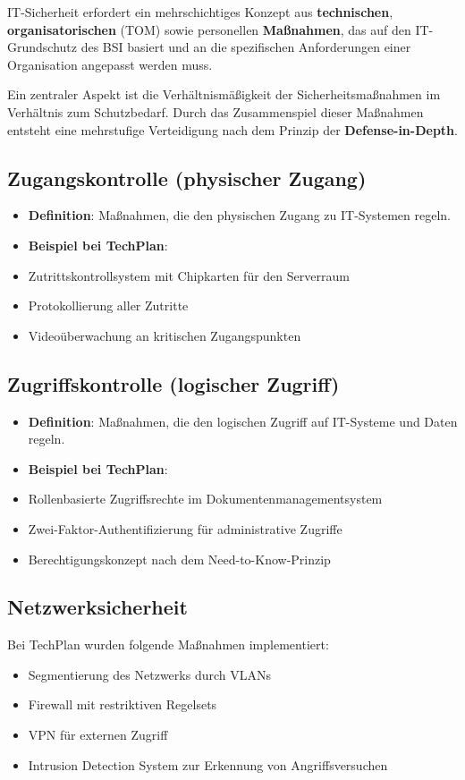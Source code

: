 \documentclass{orgstandard}
\begin{document}
IT-Sicherheit erfordert ein mehrschichtiges Konzept aus \textbf{technischen}, \textbf{organisatorischen} (TOM) sowie personellen \textbf{Maßnahmen}, das auf den IT-Grundschutz des BSI basiert und an die spezifischen Anforderungen einer Organisation angepasst werden muss.
\begin{NOTES}
Ein zentraler Aspekt ist die Verhältnismäßigkeit der Sicherheitsmaßnahmen im Verhältnis zum Schutzbedarf. Durch das Zusammenspiel dieser Maßnahmen entsteht eine mehrstufige Verteidigung nach dem Prinzip der \textbf{Defense-in-Depth}.
\end{NOTES}
\subsection{Zugangskontrolle (physischer Zugang)}
\label{sec:org2fe5f67}
\begin{itemize}
\item \textbf{Definition}: Maßnahmen, die den physischen Zugang zu IT-Systemen regeln.
\item \textbf{Beispiel bei TechPlan}:
\item Zutrittskontrollsystem mit Chipkarten für den Serverraum
\item Protokollierung aller Zutritte
\item Videoüberwachung an kritischen Zugangspunkten
\end{itemize}
\subsection{Zugriffskontrolle (logischer Zugriff)}
\label{sec:org60839ab}
\begin{itemize}
\item \textbf{Definition}: Maßnahmen, die den logischen Zugriff auf IT-Systeme und Daten regeln.
\item \textbf{Beispiel bei TechPlan}:
\item Rollenbasierte Zugriffsrechte im Dokumentenmanagementsystem
\item Zwei-Faktor-Authentifizierung für administrative Zugriffe
\item Berechtigungskonzept nach dem Need-to-Know-Prinzip
\end{itemize}
\subsection{Netzwerksicherheit}
\label{sec:org6d4883e}

Bei TechPlan wurden folgende Maßnahmen implementiert:
\begin{itemize}
\item Segmentierung des Netzwerks durch VLANs
\item Firewall mit restriktiven Regelsets
\item VPN für externen Zugriff
\item Intrusion Detection System zur Erkennung von Angriffsversuchen
\end{itemize}
\end{document}
